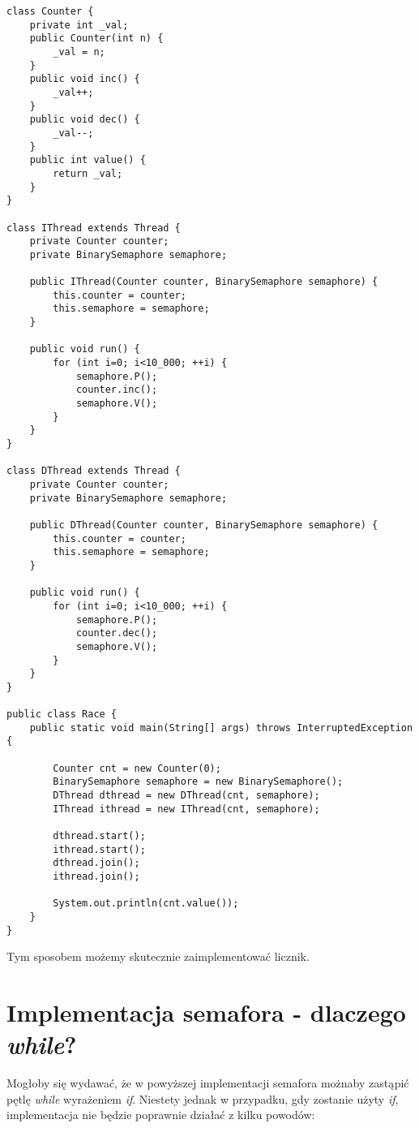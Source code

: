 \documentclass{article}
\begin{document}
\begin{verbatim}
class Counter {
    private int _val;
    public Counter(int n) {
        _val = n;
    }
    public void inc() {
        _val++;
    }
    public void dec() {
        _val--;
    }
    public int value() {
        return _val;
    }
}

class IThread extends Thread {
    private Counter counter;
    private BinarySemaphore semaphore;

    public IThread(Counter counter, BinarySemaphore semaphore) {
        this.counter = counter;
        this.semaphore = semaphore;
    }

    public void run() {
        for (int i=0; i<10_000; ++i) {
            semaphore.P();
            counter.inc();
            semaphore.V();
        }
    }
}

class DThread extends Thread {
    private Counter counter;
    private BinarySemaphore semaphore;

    public DThread(Counter counter, BinarySemaphore semaphore) {
        this.counter = counter;
        this.semaphore = semaphore;
    }

    public void run() {
        for (int i=0; i<10_000; ++i) {
            semaphore.P();
            counter.dec();
            semaphore.V();
        }
    }
}

public class Race {
    public static void main(String[] args) throws InterruptedException {

        Counter cnt = new Counter(0);
        BinarySemaphore semaphore = new BinarySemaphore();
        DThread dthread = new DThread(cnt, semaphore);
        IThread ithread = new IThread(cnt, semaphore);

        dthread.start();
        ithread.start();
        dthread.join();
        ithread.join();

        System.out.println(cnt.value());
    }
}    
\end{verbatim}

Tym sposobem możemy skutecznie zaimplementować licznik.

\section{Implementacja semafora - dlaczego \textit{while}?}

Mogłoby się wydawać, że w powyższej implementacji semafora możnaby zastąpić pętlę \textit{while} 
wyrażeniem \textit{if}. Niestety jednak w przypadku, gdy zostanie użyty \textit{if}, implementacja 
nie będzie poprawnie działać z kilku powodów:
\end{document}
